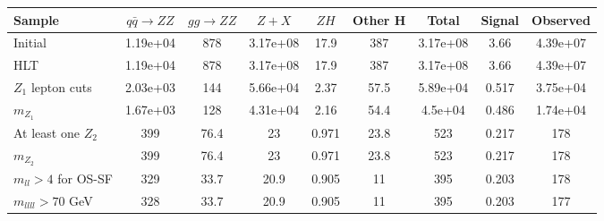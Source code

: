 \begin{table*}[htbH]    
\begin{center}    
\label{tab:yields}    
\begin{tabular}{ l | c | c | c | c | c | c | c | c }     
\hline    
\hline    
Sample & $q\bar{q} \rightarrow ZZ$ & $gg \rightarrow ZZ$ & $Z+X$ & $ZH$ & Other H & Total & Signal & Observed \\ 
\hline 
Initial & 1.19e+04 & 878 & 3.17e+08 & 17.9 & 387 & 3.17e+08 & 3.66 & 4.39e+07 \\ 
\hline 
HLT & 1.19e+04 & 878 & 3.17e+08 & 17.9 & 387 & 3.17e+08 & 3.66 & 4.39e+07 \\ 
\hline 
$Z_1$ lepton cuts & 2.03e+03 & 144 & 5.66e+04 & 2.37 & 57.5 & 5.89e+04 & 0.517 & 3.75e+04 \\ 
\hline 
$m_{Z_1}$ & 1.67e+03 & 128 & 4.31e+04 & 2.16 & 54.4 & 4.5e+04 & 0.486 & 1.74e+04 \\ 
\hline 
At least one $Z_2$ & 399 & 76.4 & 23 & 0.971 & 23.8 & 523 & 0.217 & 178 \\ 
\hline 
$m_{Z_2}$ & 399 & 76.4 & 23 & 0.971 & 23.8 & 523 & 0.217 & 178 \\ 
\hline 
$m_{ll}>4$ for OS-SF & 329 & 33.7 & 20.9 & 0.905 & 11 & 395 & 0.203 & 178 \\ 
\hline 
$m_{llll} > 70$ GeV & 328 & 33.7 & 20.9 & 0.905 & 11 & 395 & 0.203 & 177 \\ 
\hline 
\hline    
\end{tabular}    
\end{center}    
\end{table*} 

